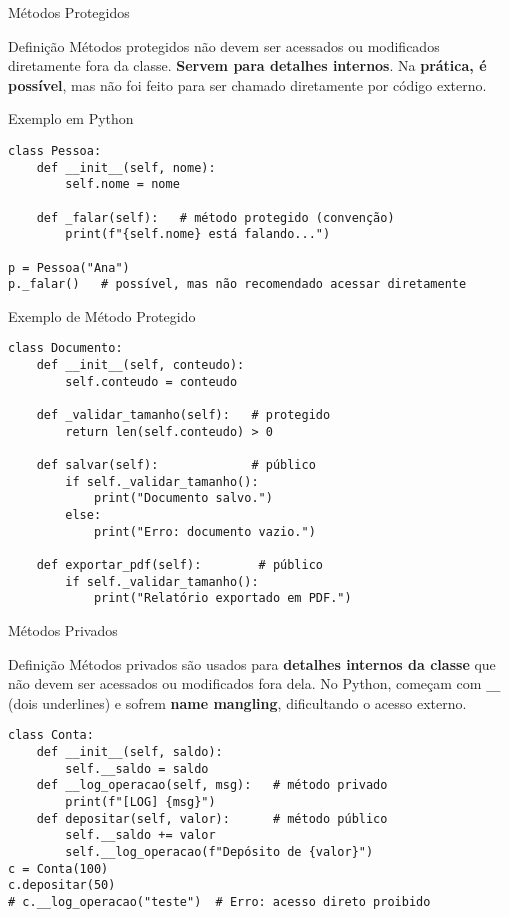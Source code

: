 \begin{frame}[fragile]{Métodos Protegidos}

\begin{block}{Definição}
Métodos protegidos não devem ser acessados ou modificados diretamente fora da classe. \textbf{Servem para detalhes internos}. Na \textbf{prática, é possível}, mas não foi feito para ser chamado diretamente por código externo.
\end{block}

\begin{exampleblock}{Exemplo em Python}
\begin{verbatim}
class Pessoa:
    def __init__(self, nome):
        self.nome = nome

    def _falar(self):   # método protegido (convenção)
        print(f"{self.nome} está falando...")

p = Pessoa("Ana")
p._falar()   # possível, mas não recomendado acessar diretamente
\end{verbatim}
\end{exampleblock}

\end{frame}


\begin{frame}[fragile]{Exemplo de Método Protegido}

\begin{verbatim}
class Documento:
    def __init__(self, conteudo):
        self.conteudo = conteudo
        
    def _validar_tamanho(self):   # protegido
        return len(self.conteudo) > 0
        
    def salvar(self):             # público
        if self._validar_tamanho():
            print("Documento salvo.")
        else:
            print("Erro: documento vazio.")

    def exportar_pdf(self):        # público
        if self._validar_tamanho():  
            print("Relatório exportado em PDF.")
\end{verbatim}

\end{frame}


\begin{frame}[fragile]{Métodos Privados}

\begin{block}{Definição}
Métodos privados são usados para \textbf{detalhes internos da classe} que não devem ser acessados ou modificados fora dela. 
No Python, começam com \texttt{\_\_} (dois underlines) e sofrem \textbf{name mangling}, dificultando o acesso externo.
\end{block}

\small
\begin{verbatim}
class Conta:
    def __init__(self, saldo):
        self.__saldo = saldo
    def __log_operacao(self, msg):   # método privado
        print(f"[LOG] {msg}")
    def depositar(self, valor):      # método público
        self.__saldo += valor
        self.__log_operacao(f"Depósito de {valor}")
c = Conta(100)
c.depositar(50)
# c.__log_operacao("teste")  # Erro: acesso direto proibido
\end{verbatim}


\end{frame}


